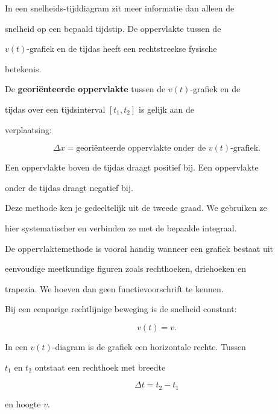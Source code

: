\documentclass{ximera}
\begin{document}




In een snelheids-tijddiagram zit meer informatie dan alleen de

snelheid op een bepaald tijdstip. De oppervlakte tussen de

$v(t)$-grafiek en de tijdas heeft een rechtstreekse fysische

betekenis.

\begin{eigenschap}

De \textbf{georiënteerde oppervlakte} tussen de $v(t)$-grafiek en de

tijdas over een tijdsinterval $[t_1,t_2]$ is gelijk aan de

verplaatsing:

\[\boxed{ \Delta x = \text{georiënteerde oppervlakte onder de }v(t)\text{-grafiek}. }\]

Een oppervlakte boven de tijdas draagt positief bij. Een oppervlakte

onder de tijdas draagt negatief bij.

\end{eigenschap}

Deze methode ken je gedeeltelijk uit de tweede graad. We gebruiken ze

hier systematischer en verbinden ze met de bepaalde integraal.

De oppervlaktemethode is vooral handig wanneer een grafiek bestaat uit

eenvoudige meetkundige figuren zoals rechthoeken, driehoeken en

trapezia. We hoeven dan geen functievoorschrift te kennen.


Bij een eenparige rechtlijnige beweging is de snelheid constant:

\[v(t)=v.\]

In een $v(t)$-diagram is de grafiek een horizontale rechte. Tussen

$t_1$ en $t_2$ ontstaat een rechthoek met breedte

\[\Delta t=t_2-t_1\]

en hoogte $v$.
\end{document}
